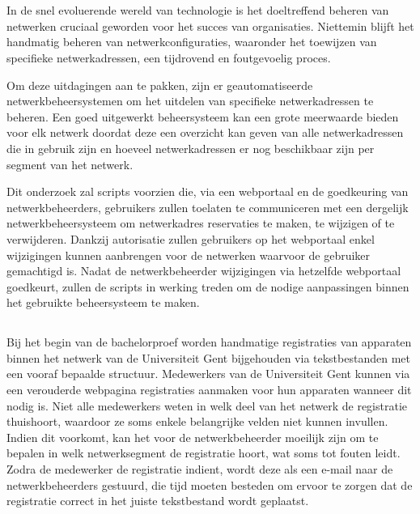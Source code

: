 
\chapter{}%
\label{ch:inleiding}
In de snel evoluerende wereld van technologie is het doeltreffend beheren van netwerken cruciaal geworden voor het succes van organisaties. Niettemin blijft het handmatig beheren van netwerkconfiguraties, waaronder het toewijzen van specifieke netwerkadressen, een tijdrovend en foutgevoelig proces.

Om deze uitdagingen aan te pakken, zijn er geautomatiseerde netwerkbeheersystemen om het uitdelen van specifieke netwerkadressen te beheren. Een goed uitgewerkt beheersysteem kan een grote meerwaarde bieden voor elk netwerk doordat deze een overzicht kan geven van alle netwerkadressen die in gebruik zijn en hoeveel netwerkadressen er nog beschikbaar zijn per segment van het netwerk.

Dit onderzoek zal scripts voorzien die, via een webportaal en de goedkeuring van netwerkbeheerders, gebruikers zullen toelaten te communiceren met een dergelijk netwerkbeheersysteem om netwerkadres reservaties te maken, te wijzigen of te verwijderen. Dankzij autorisatie zullen gebruikers op het webportaal enkel \\wijzigingen kunnen aanbrengen voor de netwerken waarvoor de gebruiker gemachtigd is. Nadat de netwerkbeheerder wijzigingen via hetzelfde webportaal goedkeurt, zullen de scripts in werking treden om de nodige aanpassingen binnen het gebruikte beheersysteem te maken.

\section{}%
\label{sec:probleemstelling}
Bij het begin van de bachelorproef worden handmatige registraties van apparaten binnen het netwerk van de Universiteit Gent bijgehouden via tekstbestanden met een vooraf bepaalde structuur. Medewerkers van de Universiteit Gent kunnen via een verouderde webpagina registraties aanmaken voor hun apparaten wanneer dit nodig is. Niet alle medewerkers weten in welk deel van het netwerk de registratie thuishoort, waardoor ze soms enkele belangrijke velden niet kunnen invullen. Indien dit voorkomt, kan het voor de netwerkbeheerder moeilijk zijn om te bepalen in welk netwerksegment de registratie hoort, wat soms tot fouten leidt. Zodra de medewerker de registratie indient, wordt deze als een e-mail naar de netwerkbeheerders gestuurd, die tijd moeten besteden om ervoor te zorgen dat de registratie correct in het juiste tekstbestand wordt geplaatst.

